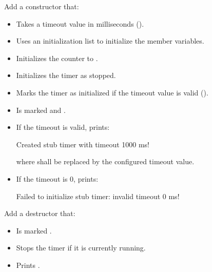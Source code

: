 \begin{parts}
  \item Add a constructor that:
  \begin{itemize}
    \item Takes a timeout value in milliseconds ().
    \item Uses an initialization list to initialize the member variables.
    \item Initializes the counter to .
    \item Initializes the timer as stopped.
    \item Marks the timer as initialized if the timeout value is valid ().
    \item Is marked  and .
    \item If the timeout is valid, prints:
\begin{console}
Created stub timer with timeout 1000 ms!
\end{console}
      where  shall be replaced by the configured timeout value.
    \item If the timeout is 0, prints:
\begin{console}
Failed to initialize stub timer: invalid timeout 0 ms!
\end{console}
  \end{itemize}

  \item Add a destructor that:
  \begin{itemize}
    \item Is marked .
    \item Stops the timer if it is currently running.
    \item Prints .
  \end{itemize}


\end{parts}

